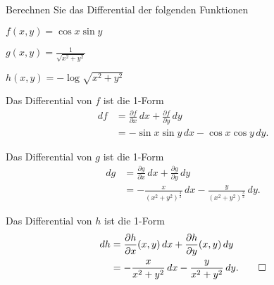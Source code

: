 Berechnen Sie das Differential der folgenden Funktionen
\begin{teilaufgaben}
\item $f(x,y)=\cos x\sin y$
\item $\displaystyle g(x,y)=\frac1{\!\sqrt{x^2+y^2}}$
\item $h(x,y)=-\log \!\sqrt{x^2+y^2}$
\end{teilaufgaben}

\begin{loesung}
\begin{teilaufgaben}
\item Das Differential von $f$ ist die 1-Form
\begin{align*}
df
&=
\frac{\partial f}{\partial x}\,dx
+
\frac{\partial f}{\partial y}\,dy
\\
&=
-\sin x \sin y \,dx
-\cos x \cos y \,dy.
\end{align*}
\item Das Differential von $g$ ist die 1-Form
\begin{align*}
dg
&=
\frac{\partial g}{\partial x}\,dx
+
\frac{\partial g}{\partial y}\,dy
\\
&=
-\frac{x}{(x^2+y^2)^{\frac32}}\,dx
-\frac{y}{(x^2+y^2)^{\frac32}}\,dy.
\end{align*}
\item Das Differential von $h$ ist die 1-Form
\begin{align*}
dh
&=
\frac{\partial h}{\partial x}(x,y)\,dx
+
\frac{\partial h}{\partial y}(x,y)\,dy
\\
&=
-
\frac{x}{x^2+y^2}\,dx
-
\frac{y}{x^2+y^2}\,dy.
\qedhere
\end{align*}
\end{teilaufgaben}
\end{loesung}

